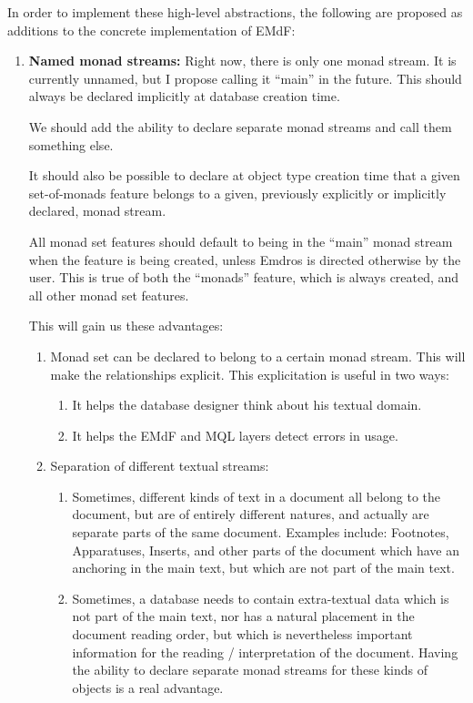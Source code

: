 \documentclass[a4paper,12pt]{article}
\begin{document}
\noindent In order to implement these high-level abstractions, the
following are proposed as additions to the concrete implementation of
EMdF:

\begin{enumerate}
\item \textbf{Named monad streams:} Right now, there is only one monad
  stream.  It is currently unnamed, but I propose calling it ``main''
  in the future.  This should always be declared implicitly at
  database creation time.

  We should add the ability to declare separate monad streams and call
  them something else.

  It should also be possible to declare at object type creation time
  that a given set-of-monads feature belongs to a given, previously
  explicitly or implicitly declared, monad stream.

  All monad set features should default to being in the ``main'' monad
  stream when the feature is being created, unless Emdros is directed
  otherwise by the user.  This is true of both the ``monads'' feature,
  which is always created, and all other monad set features.
  
  This will gain us these advantages:
  \begin{enumerate}
  \item Monad set can be declared to belong to a certain monad stream.
    This will make the relationships explicit.  This explicitation is
    useful in two ways:
    \begin{enumerate}
      \item It helps the database designer think about his textual
        domain.
      \item It helps the EMdF and MQL layers detect errors in usage.
    \end{enumerate}

  \item Separation of different textual streams:

    \begin{enumerate}
    \item Sometimes, different kinds of text in a document all belong
      to the document, but are of entirely different natures, and
      actually are separate parts of the same document.  Examples
      include: Footnotes, Apparatuses, Inserts, and other parts of the
      document which have an anchoring in the main text, but which are
      not part of the main text.
    \item Sometimes, a database needs to contain extra-textual data
      which is not part of the main text, nor has a natural placement
      in the document reading order, but which is nevertheless
      important information for the reading / interpretation of the
      document.  Having the ability to declare separate monad streams
      for these kinds of objects is a real advantage.
    \end{enumerate}
  \end{enumerate}


\end{enumerate}
\end{document}
